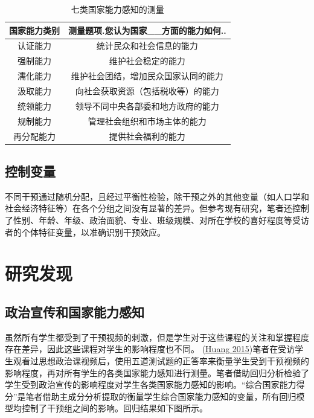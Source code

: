 \documentclass[
  12pt,
]{ctexart}
\begin{document}
\begin{table}[!h]

\caption{\label{tab:unnamed-chunk-5}七类国家能力感知的测量}
\centering
\begin{tabular}[t]{cc}
\toprule
国家能力类别 & 测量题项.您认为国家\_\_方面的能力如何..\\
\midrule
认证能力 & 统计民众和社会信息的能力\\
强制能力 & 维护社会稳定的能力\\
濡化能力 & 维护社会团结，增加民众国家认同的能力\\
汲取能力 & 向社会获取资源（包括税收等）的能力\\
统领能力 & 领导不同中央各部委和地方政府的能力\\
\addlinespace
规制能力 & 管理社会组织和市场主体的能力\\
再分配能力 & 提供社会福利的能力\\
\bottomrule
\end{tabular}
\end{table}

\hypertarget{ux63a7ux5236ux53d8ux91cf}{%
\subsection{控制变量}\label{ux63a7ux5236ux53d8ux91cf}}

不同干预通过随机分配，且经过平衡性检验，除干预之外的其他变量（如人口学和社会经济特征等）在各个分组之间没有显著的差异。但参考现有研究，笔者还控制了性别、年龄、年级、政治面貌、专业、班级规模、对所在学校的喜好程度等受访者的个体特征变量，以准确识别干预效应。

\hypertarget{ux7814ux7a76ux53d1ux73b0}{%
\section{研究发现}\label{ux7814ux7a76ux53d1ux73b0}}

\hypertarget{ux653fux6cbbux5ba3ux4f20ux548cux56fdux5bb6ux80fdux529bux611fux77e5}{%
\subsection{政治宣传和国家能力感知}\label{ux653fux6cbbux5ba3ux4f20ux548cux56fdux5bb6ux80fdux529bux611fux77e5}}

虽然所有学生都受到了干预视频的刺激，但是学生对于这些课程的关注和掌握程度存在差异，因此这些课程对学生的影响程度也不同。 (\protect\hyperlink{ref-Huang2015a}{Huang 2015})笔者在受访学生观看过思想政治课视频后，使用五道测试题的正答率来衡量学生受到干预视频的影响程度，再对所有学生的各类国家能力感知进行测量。笔者借助回归分析检验了学生受到政治宣传的影响程度对学生各类国家能力感知的影响。``综合国家能力得分''是笔者借助主成分分析提取的衡量学生综合国家能力感知的变量，所有回归模型均控制了干预组之间的影响。回归结果如下图所示。
\end{document}
